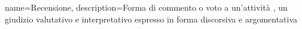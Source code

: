 {
	name={Recensione},
	description={Forma di commento o voto a un'attività , un giudizio valutativo e interpretativo espresso in forma discorsiva e argomentativa}
}
